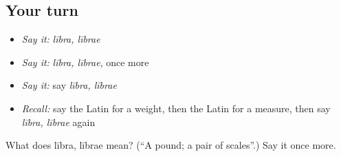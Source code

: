 \subsection*{Your turn}
\begin{itemize}
\raggedright
  \item \emph{Say it:} \emph{lībra, lībrae}
  \item \emph{Say it:} \emph{lībra, lībrae}, once more
  \item \emph{Say it:} say \emph{lībra, lībrae}
  \item \emph{Recall:} say the Latin for a weight, then the Latin for a measure, then say \emph{lībra, lībrae} again
\end{itemize}

\begin{tcolorbox}[breakable,colback=teal!4,colframe=teal!35!black,title={Before you move on}]
What does lībra, lībrae mean? (\textquotedblleft{}A pound; a pair of scales\textquotedblright{}.) Say it once more.
\end{tcolorbox}
